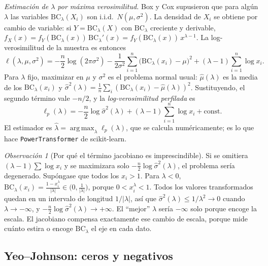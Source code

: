 \documentclass[11pt]{article}
\theoremstyle{definition}
\theoremstyle{remark}
\newtheorem{observacion}[teorema]{Observación}
\DeclareMathOperator*{\argmax}{arg\,max}
\newcommand{\BC}{\mathrm{BC}}
\newcommand{\abs}[1]{\left\lvert #1\right\rvert}
\begin{document}
\medskip

\noindent \emph{Estimación de $\lambda$ por máxima verosimilitud.} Box y Cox supusieron que para algún $\lambda$ las variables $\BC_\lambda(X_i)$ son i.i.d.\ $N(\mu,\sigma^2)$. La densidad de $X_i$ se obtiene por cambio de variable: si $Y=\BC_\lambda(X)$ con $\BC_\lambda$ creciente y derivable, $f_X(x)=f_Y(\BC_\lambda(x))\,\BC_\lambda'(x)=f_Y(\BC_\lambda(x))\,x^{\lambda-1}$. La log-verosimilitud de la muestra es entonces
\begin{equation}\label{eq:bc-lik}
\ell(\lambda,\mu,\sigma^2)=-\frac n2\log(2\pi\sigma^2)-\frac1{2\sigma^2}\sum_{i=1}^n\big(\BC_\lambda(x_i)-\mu\big)^2+(\lambda-1)\sum_{i=1}^n\log x_i.
\end{equation}
Para $\lambda$ fijo, maximizar en $\mu$ y $\sigma^2$ es el problema normal usual: $\hat\mu(\lambda)$ es la media de los $\BC_\lambda(x_i)$ y $\hat\sigma^2(\lambda)=\frac1n\sum_i(\BC_\lambda(x_i)-\hat\mu(\lambda))^2$. Sustituyendo, el segundo término vale $-n/2$, y la \emph{log-verosimilitud perfilada} es
\begin{equation}\label{eq:bc-perfil}
\ell_p(\lambda)=-\frac n2\log\hat\sigma^2(\lambda)+(\lambda-1)\sum_{i=1}^n\log x_i+\text{const}.
\end{equation}
El estimador es $\hat\lambda=\argmax_\lambda\ell_p(\lambda)$, que se calcula numéricamente; es lo que hace \texttt{PowerTransformer} de scikit-learn.

\begin{observacion}[Por qué el término jacobiano es imprescindible]\label{obs:jacobiano}
\noindent Si se omitiera $(\lambda-1)\sum\log x_i$ y se maximizara solo $-\frac n2\log\hat\sigma^2(\lambda)$, el problema sería degenerado. Supóngase que todos los $x_i>1$. Para $\lambda<0$, $\BC_\lambda(x_i)=\frac{1-x_i^{\lambda}}{\abs{\lambda}}\in\big(0,\frac1{\abs\lambda}\big)$, porque $0<x_i^\lambda<1$. Todos los valores transformados quedan en un intervalo de longitud $1/\abs\lambda$, así que $\hat\sigma^2(\lambda)\le1/\lambda^2\to0$ cuando $\lambda\to-\infty$, y $-\frac n2\log\hat\sigma^2(\lambda)\to+\infty$. El ``mejor'' $\lambda$ sería $-\infty$ solo porque encoge la escala. El jacobiano compensa exactamente ese cambio de escala, porque mide cuánto estira o encoge $\BC_\lambda$ el eje en cada dato.
\end{observacion}

\subsection{Yeo--Johnson: ceros y negativos}\label{sec:yj}
\end{document}
